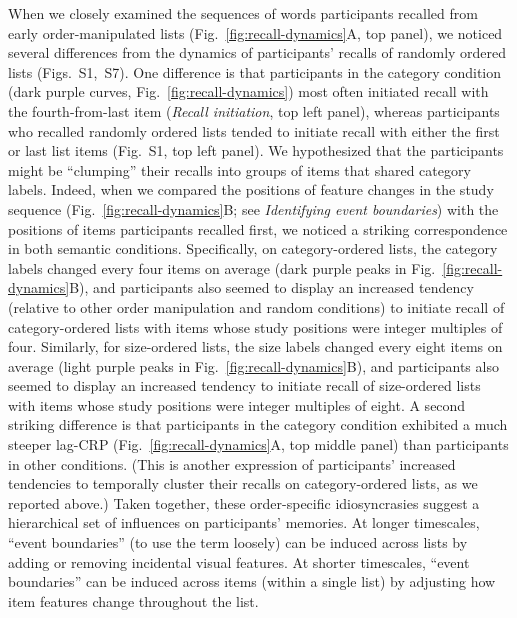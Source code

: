 \documentclass[11pt]{article}
\newcommand{\dynamicsRandom}{S1}
\newcommand{\recallInit}{S7}
\begin{document}
When we closely examined the sequences of words participants recalled from
early order-manipulated lists (Fig.~\ref{fig:recall-dynamics}A, top panel), we
noticed several differences from the dynamics of participants' recalls of
randomly ordered lists (Figs.~\dynamicsRandom,~\recallInit). One difference is
that participants in the category condition (dark purple curves,
Fig.~\ref{fig:recall-dynamics}) most often initiated recall with the
fourth-from-last item (\textit{Recall initiation}, top left panel), whereas
participants who recalled randomly ordered lists tended to initiate recall with
either the first or last list items (Fig.~\dynamicsRandom, top left panel). We
hypothesized that the participants might be ``clumping'' their recalls into
groups of items that shared category labels. Indeed, when we compared the
positions of feature changes in the study sequence
(Fig.~\ref{fig:recall-dynamics}B; see \textit{Identifying event boundaries})
with the positions of items participants recalled first, we noticed a striking
correspondence in both semantic conditions. Specifically, on category-ordered
lists, the category labels changed every four items on average (dark purple
peaks in Fig.~\ref{fig:recall-dynamics}B), and participants also seemed to
display an increased tendency (relative to other order manipulation and random
conditions) to initiate recall of category-ordered lists with items whose study
positions were integer multiples of four. Similarly, for size-ordered lists,
the size labels changed every eight items on average (light purple peaks in
Fig.~\ref{fig:recall-dynamics}B), and participants also seemed to display an
increased tendency to initiate recall of size-ordered lists with items whose
study positions were integer multiples of eight. A second striking difference
is that participants in the category condition exhibited a much steeper lag-CRP
(Fig.~\ref{fig:recall-dynamics}A, top middle panel) than participants in other
conditions. (This is another expression of participants' increased tendencies
to temporally cluster their recalls on category-ordered lists, as we reported
above.) Taken together, these order-specific idiosyncrasies suggest a
hierarchical set of influences on participants' memories. At longer timescales,
``event boundaries'' (to use the term loosely) can be induced across lists by
adding or removing incidental visual features. At shorter timescales, ``event
boundaries'' can be induced across items (within a single list) by adjusting
how item features change throughout the list.
\end{document}
